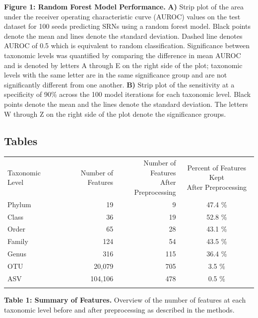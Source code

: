 \documentclass[]{article}
\begin{document}
\textbf{Figure 1: Random Forest Model Performance.} \textbf{A)} Strip
plot of the area under the receiver operating characteristic curve
(AUROC) values on the test dataset for 100 seeds predicting SRNs using a
random forest model. Black points denote the mean and lines denote the
standard deviation. Dashed line denotes AUROC of 0.5 which is equivalent
to random classification. Significance between taxonomic levels was
quantified by comparing the difference in mean AUROC and is denoted by
letters A through E on the right side of the plot; taxonomic levels with
the same letter are in the same significance group and are not
significantly different from one another. \textbf{B)} Strip plot of the
sensitivity at a specificity of 90\% across the 100 model iterations for
each taxonomic level. Black points denote the mean and the lines denote
the standard deviation. The letters W through Z on the right side of the
plot denote the significance groups.

\newpage

\subsection{Tables}\label{tables}

\begin{longtable}[c]{@{}lrrc@{}}
\toprule\addlinespace
Taxonomic Level & Number of Features &
\makecell[c]{Number of Features \\ After Preprocessing} &
\makecell[c]{Percent of Features Kept \\ After Preprocessing}
\\\addlinespace
\midrule\endhead
Phylum & 19 & 9 & 47.4 \%
\\\addlinespace
Class & 36 & 19 & 52.8 \%
\\\addlinespace
Order & 65 & 28 & 43.1 \%
\\\addlinespace
Family & 124 & 54 & 43.5 \%
\\\addlinespace
Genus & 316 & 115 & 36.4 \%
\\\addlinespace
OTU & 20,079 & 705 & 3.5 \%
\\\addlinespace
ASV & 104,106 & 478 & 0.5 \%
\\\addlinespace
\bottomrule
\end{longtable}

\textbf{Table 1: Summary of Features.} Overview of the number of
features at each taxonomic level before and after preprocessing as
described in the methods.

\newpage
\end{document}

